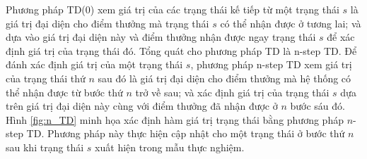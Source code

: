 Phương pháp TD(0) xem giá trị của các trạng thái kế tiếp từ một trạng thái $s$ là giá trị đại diện cho điểm thưởng mà trạng thái $s$ có thể nhận được ở tương lai; và dựa vào giá trị đại diện này và điểm thưởng nhận được ngay trạng thái $s$ để xác định giá trị của trạng thái đó. Tổng quát cho phương pháp TD là n-step TD. Để đánh xác định giá trị của một trạng thái $s$, phương pháp n-step TD xem giá trị của trạng thái thứ $n$ sau đó là giá trị đại diện cho điểm thưởng mà hệ thống có thể nhận được từ bước thứ $n$ trở về sau; và xác định giá trị của trạng thái $s$ dựa trên giá trị đại diện này cùng với điểm thưởng đã nhận được ở $n$ bước sáu đó. Hình \ref{fig:n_TD} minh họa xác định hàm giá trị trạng thái bằng phương pháp $n$-step TD. Phương pháp này thực hiện cập nhật cho một trạng thái ở bước thứ $n$ sau khi trạng thái $s$ xuất hiện trong mẫu thực nghiệm. 
